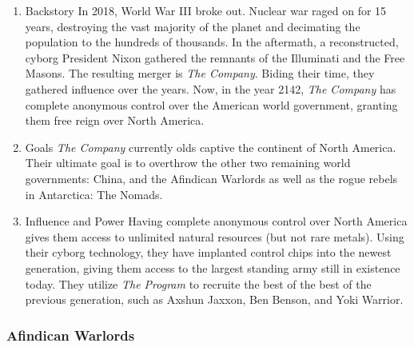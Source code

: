 \documentclass[11pt]{article}
\begin{document}
\begin{enumerate}
\item Backstory
\label{sec:orgf1b9af8}
In 2018, World War III broke out. Nuclear war raged on for 15 years, destroying the vast majority of the planet and decimating the population to the hundreds of thousands. In the aftermath, a reconstructed, cyborg President Nixon gathered the remnants of the Illuminati and the Free Masons. The resulting merger is \emph{The Company}. Biding their time, they gathered influence over the years. Now, in the year 2142, \emph{The Company} has complete anonymous control over the American world government, granting them free reign over North America.

\item Goals
\label{sec:org734528e}
\emph{The Company} currently olds captive the continent of North America. Their ultimate goal is to overthrow the other two remaining world governments: China, and the Afindican Warlords as well as the rogue rebels in Antarctica: The Nomads.

\item Influence and Power
\label{sec:org4d32e2c}
Having complete anonymous control over North America gives them access to unlimited natural resources (but not rare metals). Using their cyborg technology, they have implanted control chips into the newest generation, giving them access to the largest standing army still in existence today. They utilize \emph{The Program} to recruite the best of the best of the previous generation, such as Axshun Jaxxon, Ben Benson, and Yoki Warrior.
\end{enumerate}

\subsubsection{Afindican Warlords}
\label{sec:org1eadfcf}
\end{document}

